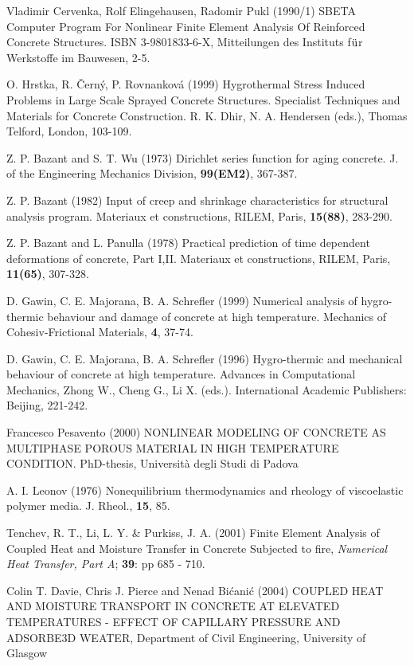 \begin{thebibliography}{99}
Vladimir Cervenka, Rolf Elingehausen, Radomir Pukl (1990/1) SBETA Computer Program For Nonlinear Finite Element Analysis 
Of Reinforced Concrete Structures. ISBN 3-9801833-6-X, Mitteilungen des Instituts f${\rm\ddot{u}}$r Werkstoffe 
im Bauwesen, 2-5.

O. Hrstka, R. \v{C}ern\'y, P. Rovnan\ii kov\'a (1999) Hygrothermal Stress Induced Problems in Large Scale Sprayed 
Concrete Structures. Specialist Techniques and Materials for Concrete Construction. R. K. Dhir, N. A. Hendersen (eds.), 
Thomas Telford, London, 103-109.

Z. P. Bazant and S. T. Wu (1973) Dirichlet series function for aging
concrete. J. of the Engineering Mechanics Division, {\bf 99(EM2)}, 367-387.

Z. P. Bazant (1982) Input of creep and shrinkage characteristics for
structural analysis program. Materiaux et constructions, RILEM, Paris, 
{\bf 15(88)}, 283-290.

Z. P. Bazant and L. Panulla (1978) Practical prediction of time
dependent deformations of concrete, Part I,II. Materiaux et
constructions, RILEM, Paris, {\bf 11(65)}, 307-328.

D. Gawin, C. E. Majorana, B. A. Schrefler (1999) Numerical analysis of hygro-thermic behaviour and damage of concrete 
at high temperature. Mechanics of Cohesiv-Frictional Materials, {\bf 4}, 37-74.

D. Gawin, C. E. Majorana, B. A. Schrefler (1996) Hygro-thermic and mechanical behaviour of concrete 
at high temperature. Advances in Computational Mechanics, Zhong W., Cheng G., Li X. (eds.). International 
Academic Publishers: Beijing, 221-242.

Francesco Pesavento (2000) NONLINEAR MODELING OF CONCRETE AS MULTIPHASE POROUS MATERIAL IN HIGH TEMPERATURE CONDITION. 
PhD-thesis, Universit\`a degli Studi di Padova

A. I. Leonov (1976) Nonequilibrium thermodynamics and rheology of viscoelastic polymer media. J. Rheol., {\bf 15}, 85. 

Tenchev, R. T., Li, L. Y. \& Purkiss, J. A. (2001) Finite Element Analysis of Coupled Heat and Moisture
Transfer in Concrete Subjected to fire, {\it Numerical Heat Transfer, Part A}; {\bf 39}: pp 685 - 710.

Colin T. Davie, Chris J. Pierce and Nenad Bi\'cani\'c (2004) COUPLED HEAT AND MOISTURE TRANSPORT IN CONCRETE AT ELEVATED
TEMPERATURES - EFFECT OF CAPILLARY PRESSURE AND ADSORBE3D WEATER, Department of Civil Engineering, University of Glasgow

\end{thebibliography}
